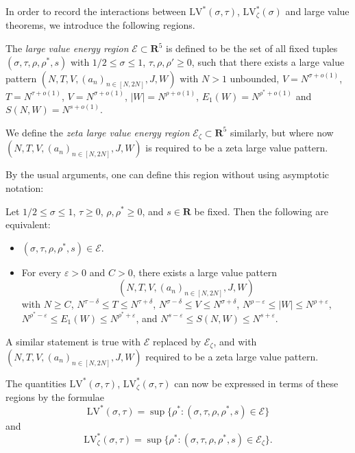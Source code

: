 \documentclass[a4paper, 10pt]{amsart}
\newcommand{\eps}{\varepsilon}
\newcommand{\R}{\mathbf{R}}
\newcommand{\LV}{\mathrm{LV}}
\newcommand{\Energy}{\mathcal{E}}
\begin{document}
In order to record the interactions between $\LV^*(\sigma,\tau)$, $\LV^*_\zeta(\sigma)$ and large value theorems, we introduce the following regions.

\begin{definition}\label{lv-edef} The \emph{large value energy region} $\Energy \subset \R^5$ is defined to be the set of all fixed tuples $(\sigma,\tau,\rho,\rho^*,s)$ with $1/2 \leq \sigma \leq 1$, $\tau, \rho, \rho' \geq 0$, such that there exists a large value pattern $(N,T,V,(a_n)_{n \in [N,2N]},J,W)$ with $N>1$ unbounded, $V = N^{\sigma+o(1)}$, $T = N^{\tau+o(1)}$, $V = N^{\sigma+o(1)}$, $|W| = N^{\rho+o(1)}$, $E_1(W) = N^{\rho^*+o(1)}$ and $S(N,W) = N^{s+o(1)}$.

    We define the \emph{zeta large value energy region} $\Energy_\zeta \subset \R^5$ similarly, but where now $(N,T,V,(a_n)_{n \in [N,2N]},J,W)$ is required to be a zeta large value pattern.
\end{definition}

By the usual arguments, one can define this region without using asymptotic notation:

\begin{lemma}\label{lve-asymp} Let $1/2 \leq \sigma \leq 1$, $\tau \geq 0$,  $\rho, \rho^* \geq 0$, and $s \in \R$ be fixed.  Then the following are equivalent:
    \begin{itemize}
    \item[(i)] $(\sigma,\tau,\rho,\rho^*,s) \in \Energy$.
    \item[(ii)] For every $\eps>0$ and $C > 0$, there exists a large value pattern $$(N,T,V,(a_n)_{n \in [N,2N]},J,W)$$ with $N \geq C$, $N^{\tau-\delta} \leq T \leq N^{\tau+\delta}$, $N^{\sigma-\delta} \leq V \leq N^{\sigma+\delta}$,
    $N^{\rho-\eps} \leq |W| \leq N^{\rho+\eps}$,
    $N^{\rho^*-\eps} \leq E_1(W) \leq N^{\rho^*+\eps}$, and
    $N^{s-\eps} \leq S(N, W) \leq N^{s+\eps}$.
    \end{itemize}
    A similar statement is true with $\Energy$ replaced by $\Energy_\zeta$, and with $(N,T,V,(a_n)_{n \in [N,2N]},J,W)$ required to be a zeta large value pattern.
\end{lemma}

The quantities $\LV^*(\sigma,\tau)$, $\LV^*_\zeta(\sigma,\tau)$ can now be expressed in terms of these regions by the formulae
\begin{equation}\label{lvs-energy}
     \LV^*(\sigma,\tau) = \sup \{ \rho^*: (\sigma,\tau,\rho,\rho^*,s) \in \Energy\}
\end{equation}
and
\begin{equation}\label{lvsz-energy}
     \LV^*_\zeta(\sigma,\tau) = \sup \{ \rho^*: (\sigma,\tau,\rho,\rho^*,s) \in \Energy_\zeta\}.
\end{equation}
\end{document}
